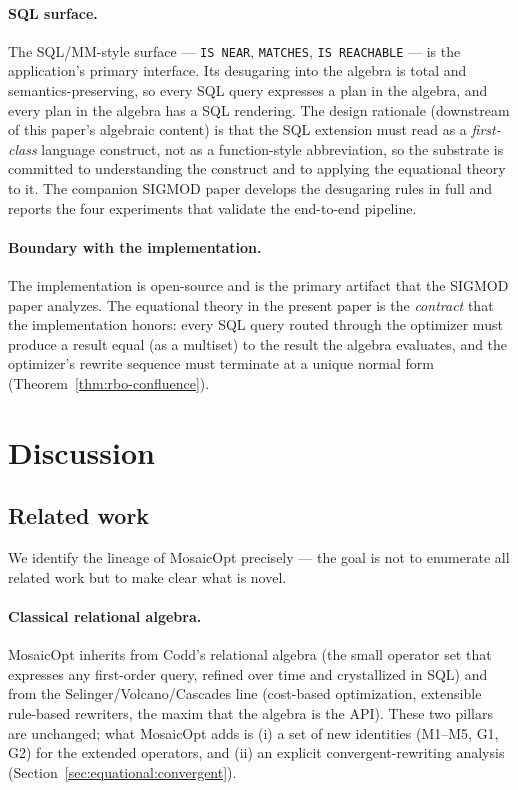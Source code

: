 \documentclass[acmsmall,review,anonymous]{acmart}
\theoremstyle{plain}
\theoremstyle{definition}
\theoremstyle{remark}
\begin{document}
\paragraph{SQL surface.}
The SQL/MM-style surface --- \texttt{IS NEAR}, \texttt{MATCHES},
\texttt{IS REACHABLE} --- is the application's primary interface.
Its desugaring into the algebra is total and semantics-preserving,
so every SQL query expresses a plan in the algebra, and every
plan in the algebra has a SQL rendering. The design rationale
(downstream of this paper's algebraic content) is that the SQL
extension must read as a \emph{first-class} language construct, not
as a function-style abbreviation, so the substrate is committed
to understanding the construct and to applying the equational
theory to it. The companion SIGMOD paper develops the desugaring
rules in full and reports the four experiments that validate
the end-to-end pipeline.

\paragraph{Boundary with the implementation.}
The implementation is open-source and is the primary artifact
that the SIGMOD paper analyzes. The equational theory in the
present paper is the \emph{contract} that the implementation
honors: every SQL query routed through the optimizer must
produce a result equal (as a multiset) to the result the
algebra evaluates, and the optimizer's rewrite sequence must
terminate at a unique normal form (Theorem~\ref{thm:rbo-confluence}).

\section{Discussion}\label{sec:related}

\subsection{Related work}

We identify the lineage of MosaicOpt precisely --- the goal is not
to enumerate all related work but to make clear what is novel.

\paragraph{Classical relational algebra.}
MosaicOpt inherits from Codd's relational algebra
\cite{codd1970} (the small operator set that expresses any
first-order query, refined over time and crystallized in SQL) and
from the Selinger/Volcano/Cascades line
\cite{selinger1979,graefe1994,graefe1995} (cost-based
optimization, extensible rule-based rewriters, the maxim that the
algebra is the API). These two pillars are unchanged; what
MosaicOpt adds is (i) a set of new identities (M1--M5, G1, G2)
for the extended operators, and (ii) an explicit
convergent-rewriting analysis
(Section~\ref{sec:equational:convergent}).
\end{document}
